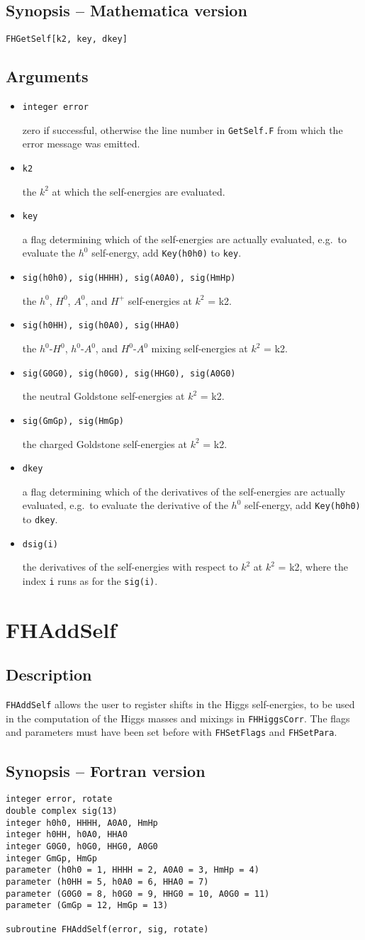 \documentclass[12pt,a4paper]{report}
\newcommand{\CODE}[1]{\texttt{#1}}
\newcommand{\VARIN}[1]{%
  \item[\fbox{\scriptsize\textsc{in}}]
  \CODE{#1}\par}
\newcommand{\VAROUT}[1]{%
  \item[\fbox{\scriptsize\textsc{out}}]
  \CODE{#1}\par}
\newcommand{\ROUTINE}[1]{\pagebreak
  \section*{#1}%
  \addcontentsline{toc}{section}{#1}}
\newcommand{\DESCRIPTION}{\subsection*{Description}}
\newcommand{\FSYNOPSIS}{\subsection*{Synopsis -- Fortran version}}
\newcommand{\MSYNOPSIS}{\subsection*{Synopsis -- Mathematica version}}
\newcommand{\ARGUMENTS}{\subsection*{Arguments}\begin{itemize}}
\newcommand{\ENDARGUMENTS}{\end{itemize}}
\newcommand\eg{e.g.\ }
\begin{document}
\MSYNOPSIS

\begin{verbatim}
FHGetSelf[k2, key, dkey]
\end{verbatim}

\ARGUMENTS

\VAROUT{integer error}
zero if successful, otherwise the line number in \CODE{GetSelf.F}
from which the error message was emitted.

\VARIN{k2}
the $k^2$ at which the self-energies are evaluated.

\VARIN{key}
a flag determining which of the self-energies are actually evaluated,
\eg to evaluate the $h^0$ self-energy, add \CODE{Key(h0h0)} to
\CODE{key}.

\VAROUT{sig(h0h0), sig(HHHH), sig(A0A0), sig(HmHp)}
the $h^0$, $H^0$, $A^0$, and $H^+$ self-energies at $k^2$ = k2.

\VAROUT{sig(h0HH), sig(h0A0), sig(HHA0)}
the $h^0$-$H^0$, $h^0$-$A^0$, and $H^0$-$A^0$ mixing self-energies at 
$k^2$ = k2.

\VAROUT{sig(G0G0), sig(h0G0), sig(HHG0), sig(A0G0)}
the neutral Goldstone self-energies at $k^2$ = k2.

\VAROUT{sig(GmGp), sig(HmGp)}
the charged Goldstone self-energies at $k^2$ = k2.

\VARIN{dkey}
a flag determining which of the derivatives of the self-energies
are actually evaluated, \eg to evaluate the derivative of the 
$h^0$ self-energy, add \CODE{Key(h0h0)} to \CODE{dkey}.

\VAROUT{dsig(i)}
the derivatives of the self-energies with respect to $k^2$ at
$k^2$ = k2, where the index \CODE{i} runs as for the \CODE{sig(i)}.

\ENDARGUMENTS


\ROUTINE{FHAddSelf}

\DESCRIPTION

\CODE{FHAddSelf} allows the user to register shifts in the Higgs
self-energies, to be used in the computation of the Higgs masses and
mixings in \CODE{FHHiggsCorr}.  The flags and parameters must have been
set before with \CODE{FHSetFlags} and \CODE{FHSetPara}.

\FSYNOPSIS

\begin{verbatim}
integer error, rotate
double complex sig(13)
integer h0h0, HHHH, A0A0, HmHp
integer h0HH, h0A0, HHA0
integer G0G0, h0G0, HHG0, A0G0
integer GmGp, HmGp
parameter (h0h0 = 1, HHHH = 2, A0A0 = 3, HmHp = 4)
parameter (h0HH = 5, h0A0 = 6, HHA0 = 7)
parameter (G0G0 = 8, h0G0 = 9, HHG0 = 10, A0G0 = 11)
parameter (GmGp = 12, HmGp = 13)

subroutine FHAddSelf(error, sig, rotate)
\end{verbatim}
\end{document}
